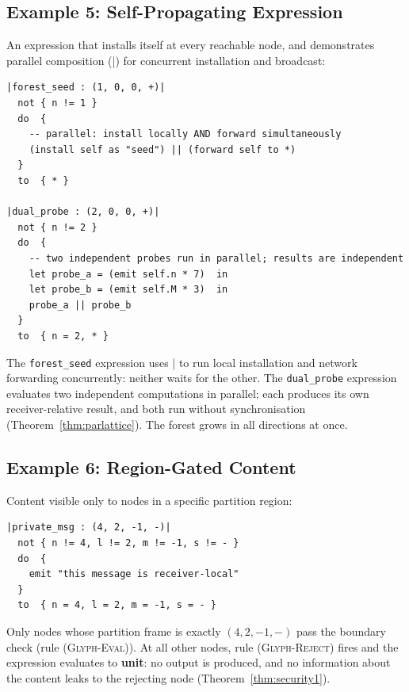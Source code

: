 \documentclass[twocolumn,11pt,a4paper]{article}
\theoremstyle{definition}
\theoremstyle{remark}
\begin{document}
\subsection{Example 5: Self-Propagating Expression}

An expression that installs itself at every reachable node, and
demonstrates parallel composition (\lstinline|||) for concurrent
installation and broadcast:

\begin{lstlisting}[caption={Self-propagating expression with parallel composition}, label={lst:ex5}]
|forest_seed : (1, 0, 0, +)|
  not { n != 1 }
  do  {
    -- parallel: install locally AND forward simultaneously
    (install self as "seed") || (forward self to *)
  }
  to  { * }

|dual_probe : (2, 0, 0, +)|
  not { n != 2 }
  do  {
    -- two independent probes run in parallel; results are independent
    let probe_a = (emit self.n * 7)  in
    let probe_b = (emit self.M * 3)  in
    probe_a || probe_b
  }
  to  { n = 2, * }
\end{lstlisting}

The \lstinline|forest_seed| expression uses \lstinline||| to run
local installation and network forwarding concurrently: neither
waits for the other.  The \lstinline|dual_probe| expression evaluates
two independent computations in parallel; each produces its own
receiver-relative result, and both run without synchronisation
(Theorem~\ref{thm:parlattice}).  The forest grows in all directions
at once.

\subsection{Example 6: Region-Gated Content}

Content visible only to nodes in a specific partition region:

\begin{lstlisting}[caption={Region-gated content}, label={lst:ex6}]
|private_msg : (4, 2, -1, -)|
  not { n != 4, l != 2, m != -1, s != - }
  do  {
    emit "this message is receiver-local"
  }
  to  { n = 4, l = 2, m = -1, s = - }
\end{lstlisting}

Only nodes whose partition frame is exactly $(4, 2, -1, -)$ pass the
boundary check (rule \textsc{(Glyph-Eval)}).  At all other nodes, rule
\textsc{(Glyph-Reject)} fires and the expression evaluates to
\textbf{unit}: no output is produced, and no information about the
content leaks to the rejecting node (Theorem~\ref{thm:security1}).
\end{document}
